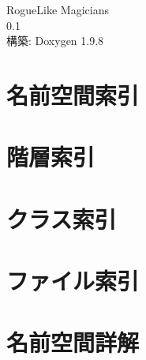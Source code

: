 \documentclass[twoside]{book}
\newcommand{\+}{\discretionary{\mbox{\scriptsize$\hookleftarrow$}}{}{}}
\newcommand{\clearemptydoublepage}{%
    \newpage{\pagestyle{empty}\cleardoublepage}%
  }
\begin{document}
  \raggedbottom
  \begin{CJK}{UTF8}{min}
    \hypersetup{pageanchor=false,
                bookmarksnumbered=true,
                pdfencoding=unicode
               }
  \begin{titlepage}
  \vspace*{7cm}
  \begin{center}%
  {\Large Rogue\+Like Magicians}\\
  [1ex]\large 0.\+1 \\
  \vspace*{1cm}
  {\large 構築\+: Doxygen 1.9.8}\\
  \end{center}
  \end{titlepage}
  \clearemptydoublepage
  \tableofcontents
  \clearemptydoublepage
  \hypersetup{pageanchor=true}
\chapter{名前空間索引}

\chapter{階層索引}

\chapter{クラス索引}

\chapter{ファイル索引}

\chapter{名前空間詳解}









\end{CJK}
\end{document}
